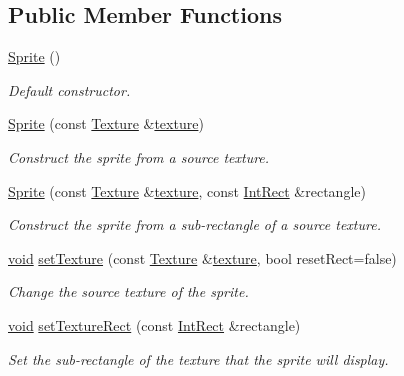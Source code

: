 \subsection*{Public Member Functions}
\begin{DoxyCompactItemize}
\item 
\hyperlink{classsf_1_1_sprite_a92559fbca895a96758abf5eabab96984}{Sprite} ()
\begin{DoxyCompactList}\small\item\em Default constructor. \end{DoxyCompactList}\item 
\hyperlink{classsf_1_1_sprite_a2a9fca374d7abf084bb1c143a879ff4a}{Sprite} (const \hyperlink{classsf_1_1_texture}{Texture} \&\hyperlink{gl3_8h_ab21590c4736d1459a5a0674a42b5a655}{texture})
\begin{DoxyCompactList}\small\item\em Construct the sprite from a source texture. \end{DoxyCompactList}\item 
\hyperlink{classsf_1_1_sprite_a01cfe1402372d243dbaa2ffa96020206}{Sprite} (const \hyperlink{classsf_1_1_texture}{Texture} \&\hyperlink{gl3_8h_ab21590c4736d1459a5a0674a42b5a655}{texture}, const \hyperlink{namespacesf_aae67411782674934f78d55fa3af18403}{Int\-Rect} \&rectangle)
\begin{DoxyCompactList}\small\item\em Construct the sprite from a sub-\/rectangle of a source texture. \end{DoxyCompactList}\item 
\hyperlink{glutf90_8h_ac778d6f63f1aaf8ebda0ce6ac821b56e}{void} \hyperlink{classsf_1_1_sprite_a3729c88d88ac38c19317c18e87242560}{set\-Texture} (const \hyperlink{classsf_1_1_texture}{Texture} \&\hyperlink{gl3_8h_ab21590c4736d1459a5a0674a42b5a655}{texture}, bool reset\-Rect=false)
\begin{DoxyCompactList}\small\item\em Change the source texture of the sprite. \end{DoxyCompactList}\item 
\hyperlink{glutf90_8h_ac778d6f63f1aaf8ebda0ce6ac821b56e}{void} \hyperlink{classsf_1_1_sprite_a3fefec419a4e6a90c0fd54c793d82ec2}{set\-Texture\-Rect} (const \hyperlink{namespacesf_aae67411782674934f78d55fa3af18403}{Int\-Rect} \&rectangle)
\begin{DoxyCompactList}\small\item\em Set the sub-\/rectangle of the texture that the sprite will display. \end{DoxyCompactList}\item 

\end{DoxyCompactItemize}
